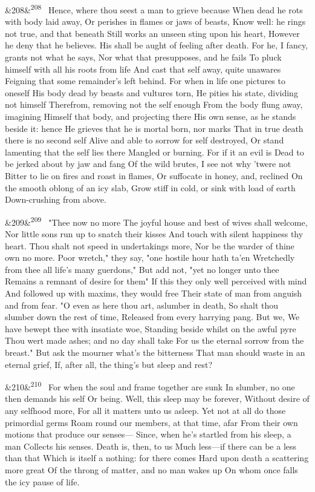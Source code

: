 \documentclass[12pt]{article}
\newcommand{\para}[1][]{\par\noindent\ifx&#1&\else\textsuperscript{\footnotesize #1}~\fi}
\begin{document}
\para[208] Hence, where thou seest a man to grieve because When dead he rots with body laid away, Or perishes in flames or jaws of beasts, Know well: he rings not true, and that beneath Still works an unseen sting upon his heart, However he deny that he believes. His shall be aught of feeling after death. For he, I fancy, grants not what he says, Nor what that presupposes, and he fails To pluck himself with all his roots from life And cast that self away, quite unawares Feigning that some remainder's left behind. For when in life one pictures to oneself His body dead by beasts and vultures torn, He pities his state, dividing not himself Therefrom, removing not the self enough From the body flung away, imagining Himself that body, and projecting there His own sense, as he stands beside it: hence He grieves that he is mortal born, nor marks That in true death there is no second self Alive and able to sorrow for self destroyed, Or stand lamenting that the self lies there Mangled or burning. For if it an evil is Dead to be jerked about by jaw and fang Of the wild brutes, I see not why 'twere not Bitter to lie on fires and roast in flames, Or suffocate in honey, and, reclined On the smooth oblong of an icy slab, Grow stiff in cold, or sink with load of earth Down-crushing from above.

\para[209] "Thee now no more The joyful house and best of wives shall welcome, Nor little sons run up to snatch their kisses And touch with silent happiness thy heart. Thou shalt not speed in undertakings more, Nor be the warder of thine own no more. Poor wretch," they say, "one hostile hour hath ta'en Wretchedly from thee all life's many guerdons," But add not, "yet no longer unto thee Remains a remnant of desire for them" If this they only well perceived with mind And followed up with maxims, they would free Their state of man from anguish and from fear. "O even as here thou art, aslumber in death, So shalt thou slumber down the rest of time, Released from every harrying pang. But we, We have bewept thee with insatiate woe, Standing beside whilst on the awful pyre Thou wert made ashes; and no day shall take For us the eternal sorrow from the breast." But ask the mourner what's the bitterness That man should waste in an eternal grief, If, after all, the thing's but sleep and rest?

\para[210] For when the soul and frame together are sunk In slumber, no one then demands his self Or being. Well, this sleep may be forever, Without desire of any selfhood more, For all it matters unto us asleep. Yet not at all do those primordial germs Roam round our members, at that time, afar From their own motions that produce our senses--- Since, when he's startled from his sleep, a man Collects his senses. Death is, then, to us Much less---if there can be a less than that Which is itself a nothing: for there comes Hard upon death a scattering more great Of the throng of matter, and no man wakes up On whom once falls the icy pause of life.
\end{document}
